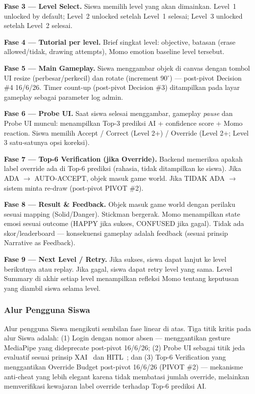 \documentclass[12pt,a4paper,oneside,openany]{report}
\begin{document}
\textbf{Fase 3 --- Level Select.} Siswa memilih level yang akan dimainkan. Level~1 unlocked by default; Level~2 unlocked setelah Level~1 selesai; Level~3 unlocked setelah Level~2 selesai.

\textbf{Fase 4 --- Tutorial per level.} Brief singkat level: objective, batasan (erase allowed/tidak, drawing attempts), Momo emotion baseline level tersebut.

\textbf{Fase 5 --- Main Gameplay.} Siswa menggambar objek di canvas dengan tombol UI resize (perbesar/perkecil) dan rotate (increment 90$^\circ$) --- post-pivot Decision \#4 16/6/26. Timer count-up (post-pivot Decision \#3) ditampilkan pada layar gameplay sebagai parameter log admin.

\textbf{Fase 6 --- Probe UI.} Saat siswa selesai menggambar, gameplay \textit{pause} dan Probe UI muncul: menampilkan Top-3 prediksi AI + confidence score + Momo reaction. Siswa memilih Accept / Correct (Level 2+) / Override (Level 2+; Level 3 satu-satunya opsi koreksi).

\textbf{Fase 7 --- Top-6 Verification (jika Override).} Backend memeriksa apakah label override ada di Top-6 prediksi (rahasia, tidak ditampilkan ke siswa). Jika ADA $\rightarrow$ AUTO-ACCEPT, objek masuk game world. Jika TIDAK ADA $\rightarrow$ sistem minta re-draw (post-pivot PIVOT \#2).

\textbf{Fase 8 --- Result \& Feedback.} Objek masuk game world dengan perilaku sesuai mapping (Solid/Danger). Stickman bergerak. Momo menampilkan state emosi sesuai outcome (HAPPY jika sukses, CONFUSED jika gagal). Tidak ada skor/leaderboard --- konsekuensi gameplay adalah feedback (sesuai prinsip Narrative as Feedback).

\textbf{Fase 9 --- Next Level / Retry.} Jika sukses, siswa dapat lanjut ke level berikutnya atau replay. Jika gagal, siswa dapat retry level yang sama. Level Summary di akhir setiap level menampilkan refleksi Momo tentang keputusan yang diambil siswa selama level.

\subsubsection{Alur Pengguna Siswa}

Alur pengguna Siswa mengikuti sembilan fase linear di atas. Tiga titik kritis pada alur Siswa adalah: (1) Login dengan nomor absen --- menggantikan gesture MediaPipe yang dideprecate post-pivot 16/6/26; (2) Probe UI sebagai titik jeda evaluatif sesuai prinsip XAI~\cite{ref3} dan HITL~\cite{ref4}; dan (3) Top-6 Verification yang menggantikan Override Budget post-pivot 16/6/26 (PIVOT \#2) --- mekanisme anti-cheat yang lebih elegant karena tidak membatasi jumlah override, melainkan memverifikasi kewajaran label override terhadap Top-6 prediksi AI.
\end{document}
